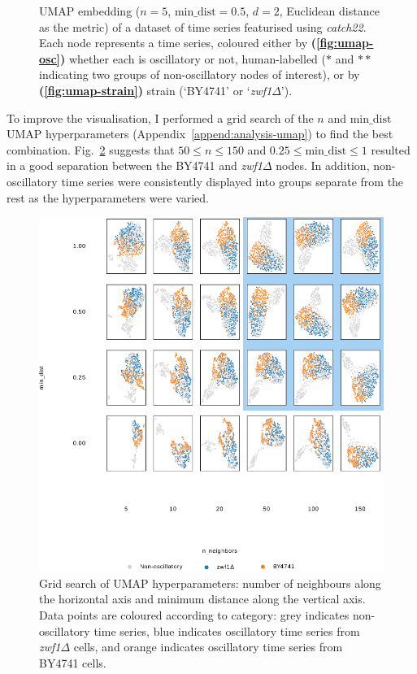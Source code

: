 \begin{figure}
  \caption[
      UMAP embedding of a dataset of time series featurised using \textit{catch22}.
    ]{
      UMAP embedding ($n=5$, $\mathrm{min\_dist} = 0.5$, $d=2$, Euclidean distance as the metric) of a dataset of time series featurised using \textit{catch22}.
      Each node represents a time series, coloured either by
      \textbf{(\ref{fig:umap-osc})}
      whether each is oscillatory or not, human-labelled ($\ast$ and $\ast \ast$ indicating two groups of non-oscillatory nodes of interest), or by
      \textbf{(\ref{fig:umap-strain})}
      strain (`BY4741' or `\textit{zwf1$\Delta$}').
    }
  \label{fig:umap}
\end{figure}

To improve the visualisation, I performed a grid search of the $n$ and $\mathrm{min\_dist}$ UMAP hyperparameters (Appendix~\ref{append:analysis-umap}) to find the best combination.
Fig.\ \ref{fig:umap-gridsearch} suggests that $50 \leq n \leq 150$ and $0.25 \leq \mathrm{min\_dist} \leq 1$ resulted in a good separation between the BY4741 and \textit{zwf1$\Delta$} nodes.
In addition, non-oscillatory time series were consistently displayed into groups separate from the rest as the hyperparameters were varied.

\begin{figure}
  \centering
    \includegraphics[width=0.9\linewidth]{umap_grid_is20016_edit3.png}
    \caption[
      Grid search of UMAP hyperparameters.
    ]{
      Grid search of UMAP hyperparameters: number of neighbours along the horizontal axis and minimum distance along the vertical axis.
      Data points are coloured according to category: grey indicates non-oscillatory time series, blue indicates oscillatory time series from \textit{zwf1$\Delta$} cells, and orange indicates oscillatory time series from BY4741 cells.
    }
  \label{fig:umap-gridsearch}
\end{figure}


